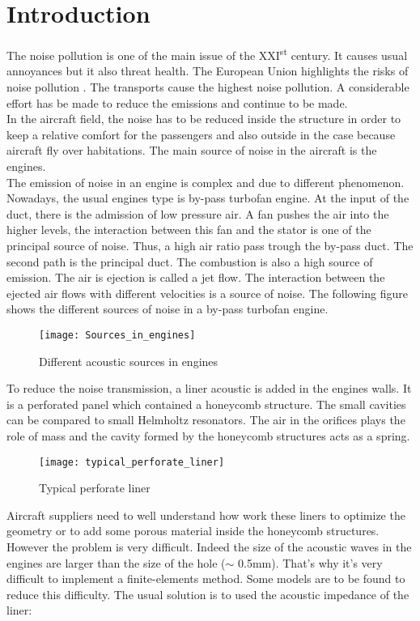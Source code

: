 \section{Introduction}
The noise pollution is one of the main issue of the XXI\textsuperscript{st} century. It causes usual annoyances but it also threat health. The European Union highlights the risks of noise pollution \cite{Noise_in_Europe}. The transports cause the highest noise pollution.  A considerable effort has be made to reduce the emissions and continue to be made.\\ 
In the aircraft field, the noise has to be reduced inside the structure in order to keep a relative comfort for the passengers and also outside in the case because aircraft fly over habitations. The main source of noise in the aircraft is the engines.\\
The emission of noise in an engine is complex and due to different phenomenon. Nowadays, the usual engines type is by-pass turbofan engine. At the input of the duct, there is the admission of low pressure air. A fan pushes the air into the higher levels, the interaction between this fan and the stator is one of the principal source of noise. Thus, a high air ratio pass trough the by-pass duct. The second path is the principal duct. The combustion is also a high source of emission. The air is ejection is called a jet flow. The interaction between the ejected air flows with different velocities is a source of noise. The following figure shows the different sources of noise in a by-pass turbofan engine.
\begin{figure}[H] \centering
    \texttt{[image: Sources\_in\_engines]}
    \caption{Different acoustic sources in engines \cite{Zhou_thesis}}
\end{figure}
To reduce the noise transmission, a liner acoustic is added in the engines walls. It is a perforated panel which contained a honeycomb structure. The small cavities can be compared to small Helmholtz resonators. The air in the orifices plays the role of mass and the cavity formed by the honeycomb structures acts as a spring.
\begin{figure}[H] \centering
\label{fig:Sources_in_engines2}
    \texttt{[image: typical\_perforate\_liner]}
    \caption{Typical perforate liner \cite{The_jet_engine}}
\end{figure}
Aircraft suppliers need to well understand how work these liners to optimize the geometry or to add some porous material inside the honeycomb structures. However the problem is very difficult. Indeed the size of the acoustic waves in the engines are larger than the size of the hole ($\sim$ 0.5mm). That's why it's very difficult to implement a finite-elements method. Some models are to be found to reduce this difficulty. The usual solution is to used the acoustic impedance of the liner:
